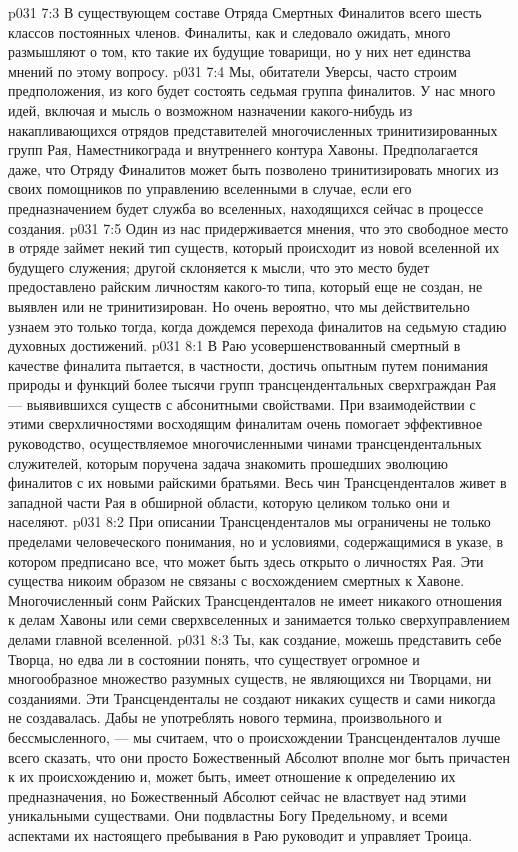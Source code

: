\vs p031 7:3 \pc В существующем составе Отряда Смертных Финалитов всего шесть классов постоянных членов. Финалиты, как и следовало ожидать, много размышляют о том, кто такие их будущие товарищи, но у них нет единства мнений по этому вопросу.
\vs p031 7:4 Мы, обитатели Уверсы, часто строим предположения, из кого будет состоять седьмая группа финалитов. У нас много идей, включая и мысль о возможном назначении какого\hyp{}нибудь из накапливающихся отрядов представителей многочисленных тринитизированных групп Рая, Наместникограда и внутреннего контура Хавоны. Предполагается даже, что Отряду Финалитов может быть позволено тринитизировать многих из своих помощников по управлению вселенными в случае, если его предназначением будет служба во вселенных, находящихся сейчас в процессе создания.
\vs p031 7:5 Один из нас придерживается мнения, что это свободное место в отряде займет некий тип существ, который происходит из новой вселенной их будущего служения; другой склоняется к мысли, что это место будет предоставлено райским личностям какого\hyp{}то типа, который еще не создан, не выявлен или не тринитизирован. Но очень вероятно, что мы действительно узнаем это только тогда, когда дождемся перехода финалитов на седьмую стадию духовных достижений.
\vs p031 8:1 В Раю усовершенствованный смертный в качестве финалита пытается, в частности, достичь опытным путем понимания природы и функций более тысячи групп трансцендентальных сверхграждан Рая --- выявившихся существ с абсонитными свойствами. При взаимодействии с этими сверхличностями восходящим финалитам очень помогает эффективное руководство, осуществляемое многочисленными чинами трансцендентальных служителей, которым поручена задача знакомить прошедших эволюцию финалитов с их новыми райскими братьями. Весь чин Трансценденталов живет в западной части Рая в обширной области, которую целиком только они и населяют.
\vs p031 8:2 При описании Трансценденталов мы ограничены не только пределами человеческого понимания, но и условиями, содержащимися в указе, в котором предписано все, что может быть здесь открыто о личностях Рая. Эти существа никоим образом не связаны с восхождением смертных к Хавоне. Многочисленный сонм Райских Трансценденталов не имеет никакого отношения к делам Хавоны или семи сверхвселенных и занимается только сверхуправлением делами главной вселенной.
\vs p031 8:3 Ты, как создание, можешь представить себе Творца, но едва ли в состоянии понять, что существует огромное и многообразное множество разумных существ, не являющихся ни Творцами, ни созданиями. Эти Трансценденталы не создают никаких существ и сами никогда не создавалась. Дабы не употреблять нового термина, произвольного и бессмысленного, --- мы считаем, что о происхождении Трансценденталов лучше всего сказать, что они просто  Божественный Абсолют вполне мог быть причастен к их происхождению и, может быть, имеет отношение к определению их предназначения, но Божественный Абсолют сейчас не властвует над этими уникальными существами. Они подвластны Богу Предельному, и всеми аспектами их настоящего пребывания в Раю руководит и управляет Троица.
